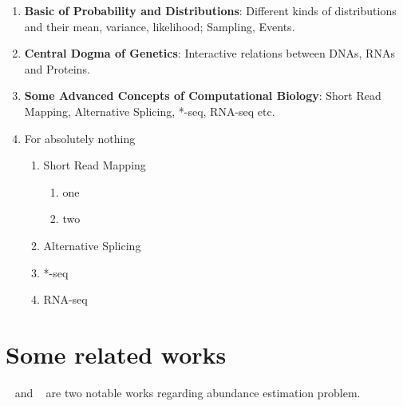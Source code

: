 \documentclass[10pt,a4paper]{article}
\begin{document}
\begin{enumerate}
\item \textbf{Basic of Probability and Distributions}: Different kinds of distributions and their mean, variance, likelihood; Sampling, Events.
\item \textbf{Central Dogma of Genetics}: Interactive relations between DNAs, RNAs and Proteins.
\item \textbf{Some Advanced Concepts of Computational Biology}: Short Read Mapping, Alternative Splicing, *-seq, RNA-seq etc.
\item For absolutely nothing

\begin{enumerate}
    \item Short Read Mapping
    \begin{enumerate}
    \item one
    \item two
    \end{enumerate}
    \item Alternative Splicing
    \item *-seq
    \item RNA-seq
\end{enumerate}
\end{enumerate}






\section{Some related works}
~\cite{li2011rsem} and ~\cite{li2009rna} are two notable works regarding abundance estimation problem.



\end{document}
